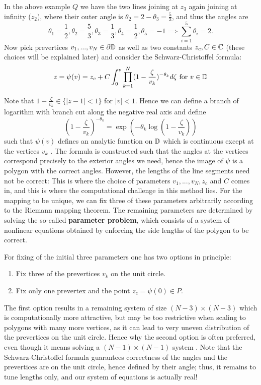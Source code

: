 \label{infinity}
In the above example $Q$ we have the two lines joining at $z_3$ again joining at infinity ($z_2$), where their outer angle is $\theta_2=2 - \theta_3 = \frac{5}{3}$, and thus the angles are 
$$\theta_1=\frac{1}{2}, \theta_2=\frac{5}{3}, \theta_3=\frac{1}{3}, \theta_4=\frac{1}{2}, \theta_5=-1 \implies \sum_{i=1}^{5} \theta_i = 2.$$
Now pick prevertices $v_1, ..., v_N \in \partial\mathbb{D}$ as well as two constants $z_c,C\in\mathbb{C}$ (these choices will be explained later) and consider the Schwarz-Christoffel formula:
\begin{equation} %
    z=\psi(v)= z_c + C\int_{0}^{v} \prod_{k=1}^{N} (1-\frac{\zeta}{v_k})^{-\theta_k} d\zeta \text{ for } v\in\disk
\end{equation}

Note that $1-\frac{\zeta}{v_k} \in \{|z-1|<1 \}$ for $|v|<1$. Hence we can define a branch of logarithm with branch cut along the negative real axis and define
\begin{equation}
    (1-\frac{\zeta}{v_k})^{-\theta_k} = \exp(-\theta_k \log(1-\frac{\zeta}{v_k}))
\end{equation} 
such that $\psi(v)$ defines an analytic function on $\mathbb{D}$ which is continuous except at the vertices $v_k$ \cite[Eq. 1.2]{Trefethen1980_SCnumericalcomputation}.
The formula is constructed such that the angles at the vertices correspond precisely to the exterior angles we need, hence the image of $\psi$ is a polygon with the correct angles. However, the lengths of the line segments need not be correct: This is where the choice of parameters $v_1, ..., v_N, z_c$ and $C$ comes in, and this is where the computational challenge in this method lies.
For the mapping to be unique, we can fix three of these parameters arbitrarily according to the Riemann mapping theorem. The remaining parameters are determined by solving the so-called \textbf{parameter problem}, which consists of a system of nonlinear equations obtained by enforcing the side lengths of the polygon to be correct.

For fixing of the initial three parameters one has two options in principle:
\begin{enumerate}
    \item Fix three of the prevertices $v_k$ on the unit circle.
    \item Fix only one prevertex and the point $z_c=\psi(0)\in P$. 
\end{enumerate}
The first option results in a remaining system of size $(N-3)\times(N-3)$ which is computationally more attractive, but may be too restrictive when scaling to polygons with many more vertices, as it can lead to very uneven distribution of the prevertices on the unit circle. Hence why the second option is often preferred, even though it means solving a $(N-1)\times(N-1)$ system \cite[page 84]{Trefethen1980_SCnumericalcomputation}.
Note that the Schwarz-Christoffel formula guarantees correctness of the angles and the prevertices are on the unit circle, hence defined by their angle; thus, it remains to tune lengths only, and our system of equations is actually real! 

